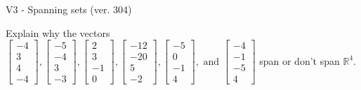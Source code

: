 \begin{exercise}
  \begin{exerciseTitle}V3 - Spanning sets (ver. 304)\end{exerciseTitle}
  \begin{exerciseStatement}
    Explain why the vectors \(\left[\begin{array}{r}
-4 \\
3 \\
4 \\
-4
\end{array}\right] , \left[\begin{array}{r}
-5 \\
-4 \\
3 \\
-3
\end{array}\right] , \left[\begin{array}{r}
2 \\
3 \\
-1 \\
0
\end{array}\right] , \left[\begin{array}{r}
-12 \\
-20 \\
5 \\
-2
\end{array}\right] , \left[\begin{array}{r}
-5 \\
0 \\
-1 \\
4
\end{array}\right] , \text{ and } \left[\begin{array}{r}
-4 \\
-1 \\
-5 \\
4
\end{array}\right]\) span or don't span \(\mathbb{R}^4\). 
	



\end{exerciseStatement}
\end{exercise}
